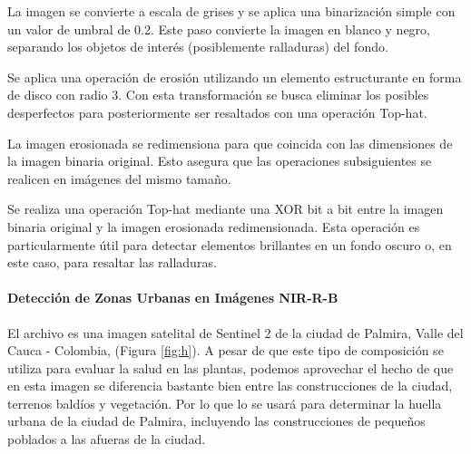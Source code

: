 \begin{seriate}

    \item La imagen se convierte a escala de grises y se aplica una binarización simple con un valor de umbral de 0.2. Este paso convierte la imagen en blanco y negro, separando los objetos de interés (posiblemente ralladuras) del fondo.
    
    \item Se aplica una operación de erosión utilizando un elemento estructurante en forma de disco con radio 3. Con esta transformación se busca eliminar los posibles desperfectos para posteriormente ser resaltados con una operación Top-hat.
    
    \item La imagen erosionada se redimensiona para que coincida con las dimensiones de la imagen binaria original. Esto asegura que las operaciones subsiguientes se realicen en imágenes del mismo tamaño.
    
    \item Se realiza una operación Top-hat mediante una XOR bit a bit entre la imagen binaria original y la imagen erosionada redimensionada. Esta operación es particularmente útil para detectar elementos brillantes en un fondo oscuro o, en este caso, para resaltar las ralladuras.
    
\end{seriate}

\paragraph{Detección de Zonas Urbanas en Imágenes NIR-R-B}

El archivo es una imagen satelital de Sentinel 2 de la ciudad de Palmira, Valle del Cauca - Colombia, (Figura \ref{fig:h}).
A pesar de que este tipo de composición se utiliza para evaluar la salud en las plantas, podemos aprovechar el hecho de que en esta imagen se diferencia bastante bien entre las construcciones de la ciudad, terrenos baldíos y vegetación. Por lo que lo se usará para determinar la huella urbana de la ciudad de Palmira, incluyendo las construcciones de pequeños poblados a las afueras de la ciudad.

